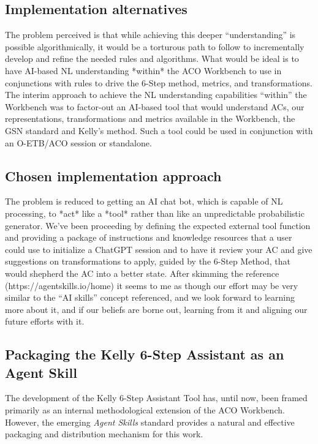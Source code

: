 \documentclass[12pt,twoside,a4paper]{article}
\begin{document}
\subsection{Implementation alternatives}
The problem perceived is that while achieving this deeper “understanding” is possible algorithmically, it would be a torturous path to follow to incrementally develop and refine the needed rules and algorithms. What would be ideal is to have AI-based NL understanding *within* the ACO Workbench to use in conjunctions with rules to drive the 6-Step method, metrics, and transformations. The interim approach to achieve the NL understanding capabilities “within” the Workbench was to factor-out an AI-based tool that would understand ACs, our representations, transformations and metrics available in the Workbench, the GSN standard and Kelly’s method. Such a tool could be used in conjunction with an O-ETB/ACO session or standalone.

\subsection{Chosen implementation approach}
The problem is reduced to getting an AI chat bot, which is capable of NL processing, to *act* like a *tool* rather than like an unpredictable probabilistic generator. We’ve been proceeding by defining the expected external tool function and providing a package of instructions and knowledge resources that a user could use to initialize a ChatGPT session and to have it review your AC and give suggestions on transformations to apply, guided by the 6-Step Method, that would shepherd the AC into a better state. After skimming the reference (https://agentskills.io/home) it seems to me as though our effort may be very similar to the “AI skills” concept referenced, and we look forward to learning more about it, and if our beliefs are borne out, learning from it and aligning our future efforts with it.

\subsection{Packaging the Kelly 6-Step Assistant as an Agent Skill}

The development of the Kelly 6-Step Assistant Tool has, until now, been framed primarily as an internal methodological extension of the ACO Workbench. However, the emerging \emph{Agent Skills} standard provides a natural and effective packaging and distribution mechanism for this work.
\end{document}
